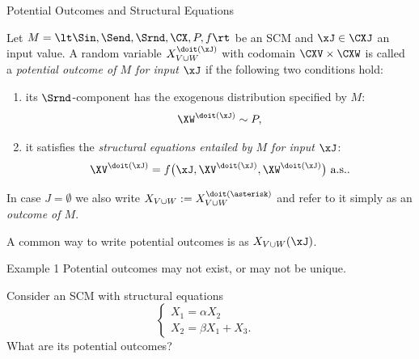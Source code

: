 \begin{frame}{Potential Outcomes and Structural Equations}
\begin{Def}[\ref{def:scm_solutions_for_inputs}]
  Let $M = \lt \Sin, \Send, \Srnd, \CX, P, f \rt$ be an SCM
  and $\xJ \in \CXJ$ an input value.
  A random variable $X_{V \cup W}^{\doit(\xJ)}$ with codomain $\CXV \times \CXW$ is called
  a \emph{potential outcome of $M$ for input $\xJ$} 
  if the following two conditions hold:
    \begin{enumerate}
      \item its $\Srnd$-component has the exogenous distribution specified by $M$: 
        $$\XW^{\doit(\xJ)} \sim P,$$
      \item it satisfies the \emph{structural equations entailed by $M$ for input $\xJ$}:
        \begin{equation}\label{eq:cscm_structural_equations}
          \XV^{\doit(\xJ)} = f\big(\xJ, \XV^{\doit(\xJ)}, \XW^{\doit(\xJ)}\big) \text{ a.s.}.
        \end{equation}
    \end{enumerate}
  In case $J = \emptyset$ we also write $X_{V \cup W} := X_{V \cup W}^{\doit(\asterisk)}$ and refer to it simply as an \emph{outcome of $M$}.
\end{Def}
A common way to write potential outcomes is as $X_{V\cup W}(\xJ)$.
\end{frame}

\begin{frame}[t]{Example 1}
Potential outcomes may not exist, or may not be unique.
\begin{Eg}
Consider an SCM with structural equations
$$\begin{cases}
  X_1 = \alpha X_2 & \\
  X_2 = \beta X_1 + X_3. &
\end{cases}$$
What are its potential outcomes?

\bigskip
{}
\end{Eg}
\end{frame}


